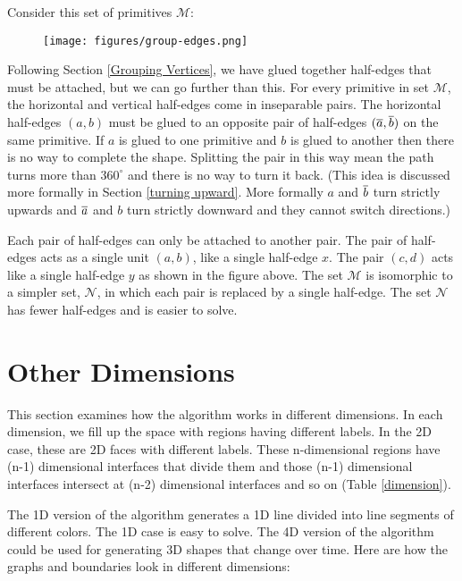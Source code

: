 \documentclass[acmtog]{acmart}
\begin{document}
Consider this set of primitives $\mathcal{M}$:

\begin{figure}[H]
\centering
\texttt{[image: figures/group-edges.png]}
\end{figure}

Following Section \ref{Grouping Vertices}, we have glued together half-edges that 
must be attached, but we can go further than this. For every primitive in set 
$\mathcal{ M}$, the horizontal and vertical half-edges come in inseparable 
pairs. The horizontal half-edges $(a, b)$ must be glued to an opposite pair
of half-edges $(\overline{a}, \overline{b})$ on the same primitive. If $a$ is glued to
one primitive and $b$ is glued to another then there is no way to complete the
shape. Splitting the pair in this way mean the path turns more than
$360^{\circ}$ and there is no way to turn it back. (This idea is discussed
more formally in Section \ref{turning upward}. More formally $a$ and $\overline{b}$
turn strictly upwards and $\overline{a}$ and $b$ turn strictly downward and they
cannot switch directions.)

Each pair of half-edges can only be attached to another pair. The pair of 
half-edges acts as a single unit $(a, b)$, like a single half-edge $x$. The pair
$(c, d)$ acts like a single half-edge $y$ as shown in the figure above. The set
$\mathcal{M}$ is isomorphic to a simpler set, $\mathcal{N}$, in which each pair is 
replaced by a single half-edge. The set $\mathcal{N}$ has fewer half-edges 
and is easier to solve.

\section{Other Dimensions}

This section examines how the algorithm works in different dimensions. In each
dimension, we fill up the space with regions having different labels. In the 2D
case, these are 2D faces with different labels. These n-dimensional regions
have (n-1) dimensional interfaces that divide them and those (n-1) dimensional
interfaces intersect at (n-2) dimensional interfaces and so on (Table
\ref{dimension}).

The 1D version of the algorithm generates a 1D line divided into line 
segments of different colors. The 1D case is easy to solve. The 4D version of 
the algorithm could be used for generating 3D shapes that change over time. Here
are how the graphs and boundaries look in different dimensions:
\end{document}
